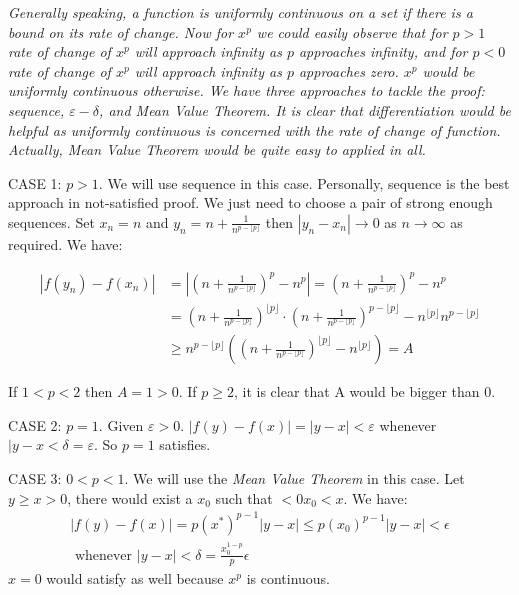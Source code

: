 \begin{numedquestion}
  \emph{Generally speaking, a function is uniformly continuous on a set if there is a bound on its rate of change. Now for $x^p$ we could easily observe that for $p>1$ rate of change of $x^p$ will approach infinity as $p$ approaches infinity, and for $p<0$ rate of change of $x^p$ will approach infinity as $p$ approaches zero. $x^p$ would be uniformly continuous otherwise. We have three approaches to tackle the proof: sequence, $\varepsilon-\delta$, and Mean Value Theorem. It is clear that differentiation would be helpful as uniformly continuous is concerned with the rate of change of function. Actually, Mean Value Theorem would be quite easy to applied in all.}

CASE 1: $p > 1$. We will use sequence in this case. Personally, sequence is the best approach in not-satisfied proof. We just need to choose a pair of strong enough sequences.  \newline
Set $x_n = n $ and $y_n = n + \frac{1}{n^{p-\lfloor p \rfloor}}$ then $|y_n - x_n | \rightarrow 0$ as $n \rightarrow \infty$ as required. We have:

\begin{align*}
  |f(y_n) - f(x_n)| &= \left|\left(n+\frac{1}{n^{p-\lfloor p \rfloor}}\right)^p - n^p\right| = \left(n+\frac{1}{n^{p-\lfloor p \rfloor}}\right)^p - n^p \\
  & = \left(n+\frac{1}{n^{p-\lfloor p \rfloor}}\right)^{\lfloor p \rfloor} \cdot\left(n+\frac{1}{n^{p-\lfloor p \rfloor}}\right)^{p-\lfloor p \rfloor}-n^{\lfloor p \rfloor} n^{p-\lfloor p \rfloor} \\
  & \geq n^{p-\lfloor p \rfloor}\left(\left(n+\frac{1}{n^{p-\lfloor p \rfloor}}\right)^{\lfloor p \rfloor}-n^{\lfloor p \rfloor}\right) = A
\end{align*}

If $1<p<2$ then $A = 1 > 0$. \newline
If $p \geq 2$, it is clear that A would be bigger than 0. 

CASE 2: $p=1$. Given $\varepsilon > 0$. $|f(y) - f(x)| = |y - x| < \varepsilon$ whenever $|y - x < \delta = \varepsilon$. So $p=1$ satisfies. 

CASE 3: $0<p<1$. We will use the \emph{ Mean Value Theorem} in this case. Let $y \geq x > 0$, there would exist a $x_0$ such that $<0x_0<x$. We have:
\[
\begin{array}{c}
\left|f\left(y\right)-f\left(x\right)\right|=p\left(x^{*}\right)^{p-1}\left|y-x\right| \leq p\left(x_{0}\right)^{p-1}\left|y-x\right|<\epsilon \\
\text { whenever }\left|y-x\right|<\delta=\frac{x_{0}^{1-p}}{p} \epsilon
\end{array}
\]
$x=0$ would satisfy as well because $x^p$ is continuous. 


\end{numedquestion}
